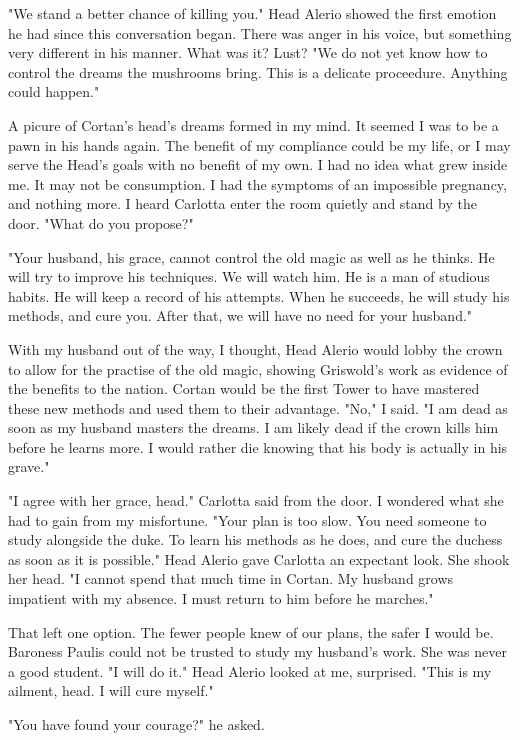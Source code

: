 \documentclass{article}
\begin{document}
"We stand a better chance of killing you." Head Alerio showed the first emotion he had since this conversation began. There was anger in his voice, but something very different in his manner. What was it? Lust? "We do not yet know how to control the dreams the mushrooms bring. This is a delicate proceedure. Anything could happen." 

A picure of Cortan's head's dreams formed in my mind. It seemed I was to be a pawn in his hands again. The benefit of my compliance could be my life, or I may serve the Head's goals with no benefit of my own. I had no idea what grew inside me. It may not be consumption. I had the symptoms of an impossible pregnancy, and nothing more. I heard Carlotta enter the room quietly and stand by the door. "What do you propose?"

"Your husband, his grace, cannot control the old magic as well as he thinks. He will try to improve his techniques. We will watch him. He is a man of studious habits. He will keep a record of his attempts. When he succeeds, he will study his methods, and cure you. After that, we will have no need for your husband." 

With my husband out of the way, I thought, Head Alerio would lobby the crown to allow for the practise of the old magic, showing Griswold's work as evidence of the benefits to the nation. Cortan would be the first Tower to have mastered these new methods and used them to their advantage. "No," I said. "I am dead as soon as my husband masters the dreams. I am likely dead if the crown kills him before he learns more. I would rather die knowing that his body is actually in his grave."

"I agree with her grace, head." Carlotta said from the door. I wondered what she had to gain from my misfortune. "Your plan is too slow. You need someone to study alongside the duke. To learn his methods as he does, and cure the duchess as soon as it is possible." Head Alerio gave Carlotta an expectant look. She shook her head. "I cannot spend that much time in Cortan. My husband grows impatient with my absence. I must return to him before he marches."

That left one option. The fewer people knew of our plans, the safer I would be. Baroness Paulis could not be trusted to study my husband's work. She was never a good student. "I will do it." Head Alerio looked at me, surprised. "This is my ailment, head. I will cure myself."

"You have found your courage?" he asked. 
\end{document}
